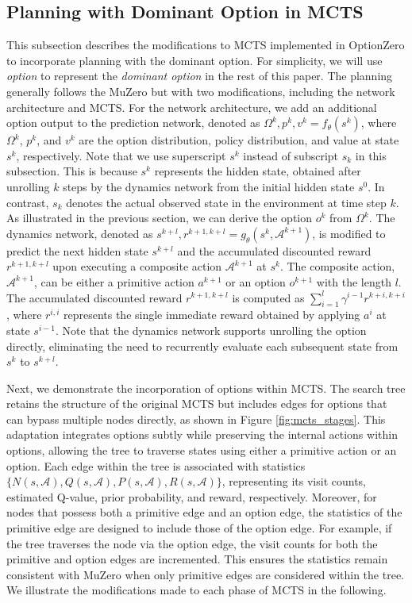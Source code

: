 \subsection{Planning with Dominant Option in MCTS}\label{sec:ozero-mcts}
This subsection describes the modifications to MCTS implemented in OptionZero to incorporate planning with the dominant option.
For simplicity, we will use \textit{option} to represent the \textit{dominant option} in the rest of this paper.
The planning generally follows the MuZero but with two modifications, including the network architecture and MCTS.
For the network architecture, we add an additional option output to the prediction network, denoted as $\Omega^k, p^k, v^k=f_\theta(s^k)$, where $\Omega^k$, $p^k$, and $v^k$ are the option distribution, policy distribution, and value at state $s^k$, respectively.
Note that we use superscript $s^k$ instead of subscript $s_k$ in this subsection.
This is because $s^k$ represents the hidden state, obtained after unrolling $k$ steps by the dynamics network from the initial hidden state $s^0$.
In contrast, $s_k$ denotes the actual observed state in the environment at time step $k$.
As illustrated in the previous section, we can derive the option $o^k$ from $\Omega^k$.
The dynamics network, denoted as $s^{k+l}, r^{k+1,k+l}=g_\theta(s^k, \mathcal{A}^{k+1})$, is modified to predict the next hidden state $s^{k+l}$ and the accumulated discounted reward $r^{k+1,k+l}$ upon executing a composite action $\mathcal{A}^{k+1}$ at $s^k$.
The composite action, $\mathcal{A}^{k+1}$, can be either a primitive action $a^{k+1}$ or an option $o^{k+1}$ with the length $l$.
The accumulated discounted reward $r^{k+1,k+l}$ is computed as $\sum_{i=1}^l\gamma^{i-1} r^{k+i,k+i}$, where $r^{i,i}$ represents the single immediate reward obtained by applying $a^i$ at state $s^{i-1}$.
Note that the dynamics network supports unrolling the option directly, eliminating the need to recurrently evaluate each subsequent state from $s^k$ to $s^{k+l}$.

Next, we demonstrate the incorporation of options within MCTS.
The search tree retains the structure of the original MCTS but includes edges for options that can bypass multiple nodes directly, as shown in Figure \ref{fig:mcts_stages}.
This adaptation integrates options subtly while preserving the internal actions within options, allowing the tree to traverse states using either a primitive action or an option.
Each edge within the tree is associated with statistics $\{N(s,\mathcal{A}), Q(s,\mathcal{A}), P(s,\mathcal{A}), R(s,\mathcal{A})\}$, representing its visit counts, estimated Q-value, prior probability, and reward, respectively.
Moreover, for nodes that possess both a primitive edge and an option edge, the statistics of the primitive edge are designed to include those of the option edge.
For example, if the tree traverses the node via the option edge, the visit counts for both the primitive and option edges are incremented.
This ensures the statistics remain consistent with MuZero when only primitive edges are considered within the tree.
We illustrate the modifications made to each phase of MCTS in the following.


